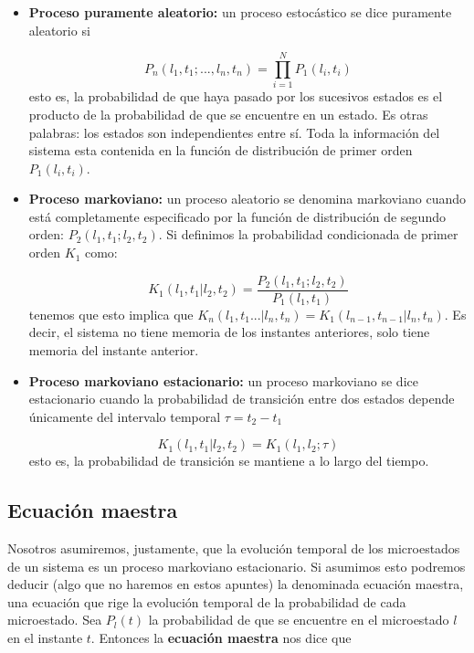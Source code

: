 \documentclass[12pt,a4paper]{article}
\numberwithin{equation}{section}
\numberwithin{figure}{section}
\theoremstyle{definition}
\begin{document}
\begin{itemize}
\item \textbf{Proceso puramente aleatorio:} un proceso estocástico se dice puramente aleatorio si 

\begin{equation}
P_n(l_1,t_1;...,l_n,t_n) = \prod_{i=1}^N P_1 (l_i,t_i)
\end{equation}
esto es, la probabilidad de que haya pasado por los sucesivos estados es el producto de la probabilidad de que se encuentre en un estado. Es otras palabras: los estados son independientes entre sí. Toda la información del sistema esta contenida en la función de distribución de primer orden $P_1 (l_i,t_i)$. 

\item \textbf{Proceso markoviano:} un proceso aleatorio se denomina markoviano cuando está completamente especificado por la función de distribución de segundo orden: $P_2 (l_1,t_1;l_2,t_2)$. Si definimos la probabilidad condicionada de primer orden $K_1$ como:

\begin{equation}
K_1(l_1,t_1 | l_2,t_2) = \dfrac{P_2 (l_1,t_1;l_2,t_2)}{P_1(l_1,t_1)}
\end{equation}
tenemos que esto implica que $K_n(l_1,t_1...|l_n,t_n)=K_1(l_{n-1},t_{n-1}|l_n,t_n)$. Es decir, el sistema no tiene memoria de los instantes anteriores, solo tiene memoria del instante anterior. 

\item \textbf{Proceso markoviano estacionario:} un proceso markoviano se dice estacionario cuando la probabilidad de transición entre dos estados depende únicamente del intervalo temporal $\tau=t_2-t_1$

$$ K_1(l_1,t_1|l_2,t_2) = K_1(l_1,l_2;\tau)$$
esto es, la probabilidad de transición se mantiene a lo largo del tiempo. 
\end{itemize}

\subsection{Ecuación maestra}

Nosotros asumiremos, justamente, que la evolución temporal de los microestados de un sistema es un proceso markoviano estacionario. Si asumimos esto podremos deducir (algo que no haremos en estos apuntes) la denominada ecuación maestra, una ecuación que rige la evolución temporal de la probabilidad de cada microestado. Sea $P_l(t)$ la probabilidad de que se encuentre en el microestado $l$ en el instante $t$. Entonces la \textbf{ecuación maestra} nos dice que
\end{document}
